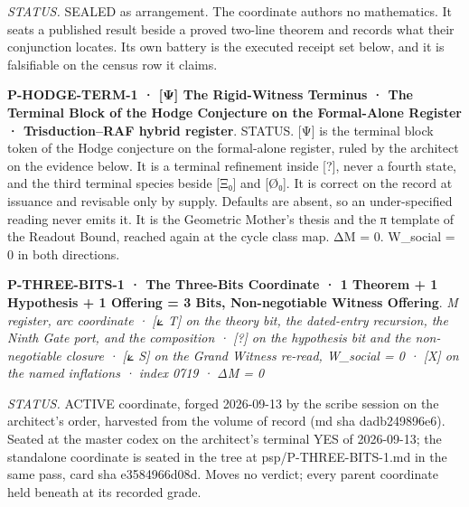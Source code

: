 \documentclass[10pt,twocolumn]{article}
\begin{document}
\emph{STATUS.} SEALED as arrangement. The coordinate authors no
mathematics. It seats a published result beside a proved two-line
theorem and records what their conjunction locates. Its own battery is
the executed receipt set below, and it is falsifiable on the census row
it claims.

\textbf{P-HODGE-TERM-1 · {[}Ψ{]} The Rigid-Witness Terminus · The
Terminal Block of the Hodge Conjecture on the Formal-Alone Register ·
Trisduction--RAF hybrid register}. STATUS. {[}Ψ{]} is the terminal block
token of the Hodge conjecture on the formal-alone register, ruled by the
architect on the evidence below. It is a terminal refinement inside
{[}?{]}, never a fourth state, and the third terminal species beside
{[}Ξ₀{]} and {[}Ø₀{]}. It is correct on the record at issuance and
revisable only by supply. Defaults are absent, so an under-specified
reading never emits it. It is the Geometric Mother's thesis and the π
template of the Readout Bound, reached again at the cycle class map. ΔM
= 0. W\_social = 0 in both directions.

\textbf{P-THREE-BITS-1 · The Three-Bits Coordinate · 1 Theorem + 1
Hypothesis + 1 Offering = 3 Bits, Non-negotiable Witness Offering}.
\emph{M register, arc coordinate · {[}⟀ T{]} on the theory bit, the
dated-entry recursion, the Ninth Gate port, and the composition ·
{[}?{]} on the hypothesis bit and the non-negotiable closure · {[}⟀ S{]}
on the Grand Witness re-read, W\_social = 0 · {[}X{]} on the named
inflations · index 0719 · ΔM = 0}

\emph{STATUS.} ACTIVE coordinate, forged 2026-09-13 by the scribe
session on the architect's order, harvested from the volume of record
(md sha dadb249896e6). Seated at the master codex on the architect's
terminal YES of 2026-09-13; the standalone coordinate is seated in the
tree at psp/P-THREE-BITS-1.md in the same pass, card sha e3584966d08d.
Moves no verdict; every parent coordinate held beneath at its recorded
grade.
\end{document}
